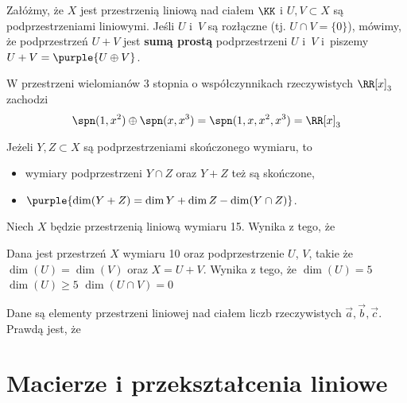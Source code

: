 Załóżmy, że $X$ jest przestrzenią liniową nad ciałem $\KK$ i $U,V\subset X$ są podprzestrzeniami liniowymi. Jeśli $U$ i~$V$ są rozłączne (tj. $U\cap V=\{0\}$), mówimy, że podprzestrzeń $U+V$ jest \textbf{sumą prostą} podprzestrzeni $U$ i~$V$ i~piszemy $U+V=\purple{U\oplus V}$.

\begin{example}
    W przestrzeni wielomianów 3 stopnia o współczynnikach rzeczywistych $\RR[x]_3$ zachodzi
    $$\spn(1, x^2) \oplus \spn(x, x^3) = \spn(1, x, x^2, x^3) = \RR[x]_3$$
\end{example}

Jeżeli $Y,Z\subset X$ są podprzestrzeniami skończonego wymiaru, to
\begin{itemize}
    \item wymiary podprzestrzeni $Y\cap Z$ oraz $Y+Z$ też są skończone,
    \item $\purple{\dim(Y+Z)=\dim{Y}+\dim{Z}-\dim(Y\cap Z)}$.
\end{itemize}

\begin{problems}
    \prob Niech $X$ będzie przestrzenią liniową wymiaru 15. Wynika z tego, że

    \prob Dana jest przestrzeń $X$ wymiaru 10 oraz podprzestrzenie $U$, $V$, takie że $\dim(U) = \dim(V)$ oraz $X = U + V$. Wynika z tego, że
    \answers
    {$\dim(U) = 5$}
    {$\dim(U) \geq 5$}
    {$\dim(U \cap V) = 0$}
    
    \prob Dane są elementy przestrzeni liniowej nad ciałem liczb rzeczywistych $\Vec{a}, \Vec{b}, \Vec{c}$. Prawdą jest, że
\end{problems}

\section{Macierze i przekształcenia liniowe}

